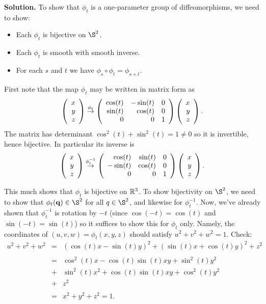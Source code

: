 \documentclass[10pt]{article}
\numberwithin{equation}{subsection}
\begin{document}
\textbf{Solution.}  To show that $\phi_t$ is a one-parameter group of
diffeomorphisms, we need to show:
\begin{itemize}
\item Each $\phi_t$ is bijective on $\S^2$.
\item Each $\phi_t$ is smooth with smooth inverse.
\item For each $s$ and $t$ we have $\phi_s \circ \phi_t = \phi_{s+t}$.
\end{itemize}
First note that the map $\phi_t$ may be written in matrix form as
$$
	\left(\begin{array}{r} x \\ y \\ z\end{array}\right) \stackrel{\phi_t}{\to}
	\left(\begin{array}{rrr} \cos(t) & -\sin(t) & 0 \\ \sin(t) &  \cos(t) & 0 \\ 0 & 0 & 1 \\ \end{array}\right)
	\left(\begin{array}{r} x \\ y \\ z\end{array}\right).
$$
The matrix has determinant $\cos^2(t) + \sin^2(t)=1 \ne 0$ so it is invertible,
hence bijective.  In particular its inverse is
$$
	\left(\begin{array}{r} x \\ y \\ z\end{array}\right) \stackrel{\phi_t^{-1}}{\to}
	\left(\begin{array}{rrr} \cos(t) & \sin(t) & 0 \\ -\sin(t) & \cos(t) & 0 \\ 0 & 0 & 1 \\ \end{array}\right)
	\left(\begin{array}{r} x \\ y \\ z\end{array}\right).
$$

This much shows that $\phi_t$ is bijective on $\mathbb{R}^3$.  To show bijectivity on
$\S^2$, we need to show that $\phi_t(\vecq) \in \S^2$ for all $q \in \S^2$, and
likewise for $\phi_t^{-1}$.  Now, we've already shown that $\phi_t^{-1}$ is
rotation by $-t$ (since $\cos(-t)=\cos(t)$ and $\sin(-t)=\sin(t)$) so it
suffices to show this for $\phi_t$ only.  Namely, the coordinates of $(u, v, w)
= \phi_t(x,y,z)$ should satisfy $u^2+v^2+w^2=1$.  Check:
\begin{eqnarray*}
	u^2 + v^2 + w^2 &=& 
		(\cos(t)x - \sin(t)y)^2 + (\sin(t)x + \cos(t)y)^2 + z^2 \\
&&\\
	&=& \cos^2(t) x - \cos(t)\sin(t)xy + \sin^2(t)y^2 \\
	&+& \sin^2(t)x^2 + \cos(t)\sin(t)xy + \cos^2(t)y^2 \\
	&+& z^2 \\
&&\\
	&=& x^2 + y^2 + z^2 = 1.
\end{eqnarray*}
\end{document}
